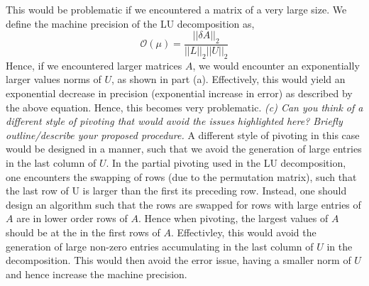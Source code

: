 \documentclass{article}
\begin{document}
This would be problematic if we encountered a matrix of a very large size. We define the machine precision of the LU decomposition as, 
$$ \mathcal{O}(\mu) = \frac{||\delta A||_{2}}{||L||_{2}||U||_{2}}$$ 
Hence, if we encountered larger matrices $A$, we would encounter an exponentially larger values norms of $U$, as shown in part (a). Effectively, this would yield an exponential decrease in precision (exponential increase in error) as described by the above equation. Hence, this becomes very problematic. \newline \newline 
\emph{(c) Can you think of a different style of pivoting that would avoid the issues highlighted here? Briefly outline/describe your proposed procedure.} \newline \newline  
A different style of pivoting in this case would be designed in a manner, such that we avoid the generation of large entries in the last column of $U$. In the partial pivoting used in the LU decomposition, one encounters the swapping of rows (due to the permutation matrix), such that the last row of U is larger than the first its preceding row. Instead, one should design an algorithm such that the rows are swapped for rows with large entries of $A$ are in lower order rows of $A$. Hence when pivoting, the largest values of $A$ should  be at the in the first rows of $A$. Effectivley, this would avoid the generation of large non-zero entries accumulating in the last column of $U$ in the decomposition. This would then avoid the error issue, having a smaller norm of $U$ and hence increase the machine precision. 
\end{document}
